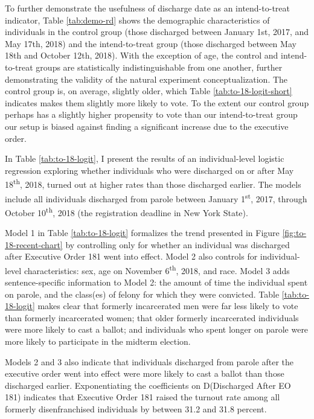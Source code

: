 \documentclass[12pt,]{article}
\begin{document}
To further demonstrate the usefulness of discharge date as an intend-to-treat indicator, Table \ref{tab:demo-rd} shows the demographic characteristics of individuals in the control group (those discharged between January 1st, 2017, and May 17th, 2018) and the intend-to-treat group (those discharged between May 18th and October 12th, 2018). With the exception of age, the control and intend-to-treat groups are statistically indistinguishable from one another, further demonstrating the validity of the natural experiment conceptualization. The control group is, on average, slightly older, which Table \ref{tab:to-18-logit-short} indicates makes them slightly more likely to vote. To the extent our control group perhaps has a slightly higher propensity to vote than our intend-to-treat group our setup is biased against finding a significant increase due to the executive order.



In Table \ref{tab:to-18-logit}, I present the results of an individual-level logistic regression exploring whether individuals who were discharged on or after May 18\textsuperscript{th}, 2018, turned out at higher rates than those discharged earlier. The models include all individuals discharged from parole between January 1\textsuperscript{st}, 2017, through October 10\textsuperscript{th}, 2018 (the registration deadline in New York State).



Model 1 in Table \ref{tab:to-18-logit} formalizes the trend presented in Figure \ref{fig:to-18-recent-chart} by controlling only for whether an individual was discharged after Executive Order 181 went into effect. Model 2 also controls for individual-level characteristics: sex, age on November 6\textsuperscript{th}, 2018, and race. Model 3 adds sentence-specific information to Model 2: the amount of time the individual spent on parole, and the class(es) of felony for which they were convicted. Table \ref{tab:to-18-logit} makes clear that formerly incarcerated men were far less likely to vote than formerly incarcerated women; that older formerly incarcerated individuals were more likely to cast a ballot; and individuals who spent longer on parole were more likely to participate in the midterm election.

Models 2 and 3 also indicate that individuals discharged from parole after the executive order went into effect were more likely to cast a ballot than those discharged earlier. Exponentiating the coefficients on D(Discharged After EO 181) indicates that Executive Order 181 raised the turnout rate among all formerly disenfranchised individuals by between 31.2 and 31.8 percent.
\end{document}
